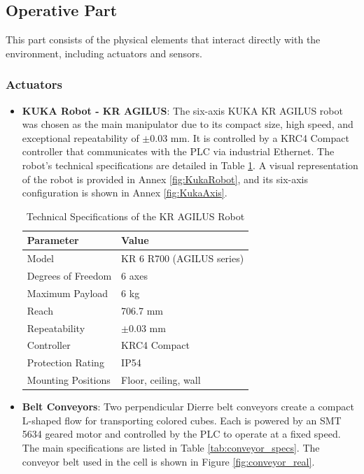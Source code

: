 \subsection{Operative Part}
This part consists of the physical elements that interact directly with the environment, including actuators and sensors.

\subsubsection{Actuators}
\begin{itemize}
  \item \textbf{KUKA Robot - KR AGILUS}: The six-axis KUKA KR AGILUS robot was chosen as the main manipulator due to its compact size, high speed, and exceptional repeatability of $\pm0.03$ mm. It is controlled by a KRC4 Compact controller that communicates with the PLC via industrial Ethernet. The robot's technical specifications are detailed in Table \ref{tab:kuka_specs}. A visual representation of the robot is provided in Annex \ref{fig:KukaRobot}, and its six-axis configuration is shown in Annex \ref{fig:KukaAxis}.
    \renewcommand{\arraystretch}{1.3} 
    \begin{table}[H] 
    \centering 
    \caption{Technical Specifications of the KR AGILUS Robot} 
    \label{tab:kuka_specs} 
    \begin{tabularx}{\textwidth}{|l|X|} 
     \hline 
     \textbf{Parameter} & \textbf{Value} \\ 
     \hline 
     Model & KR 6 R700 (AGILUS series) \\ 
     \hline 
     Degrees of Freedom & 6 axes \\ 
     \hline 
     Maximum Payload & 6 kg \\ 
     \hline 
     Reach & 706.7 mm \\ 
     \hline 
     Repeatability & $\pm0.03$ mm \\ 
     \hline 
     Controller & KRC4 Compact \\ 
     \hline 
     Protection Rating & IP54 \\ 
     \hline 
     Mounting Positions & Floor, ceiling, wall \\ 
     \hline 
    \end{tabularx} 
    \end{table}
    

    
    \item \textbf{Belt Conveyors}: Two perpendicular Dierre belt conveyors create a compact L-shaped flow for transporting colored cubes. Each is powered by an SMT 5634 geared motor and controlled by the PLC to operate at a fixed speed. The main specifications are listed in Table \ref{tab:conveyor_specs}. The conveyor belt used in the cell is shown in Figure \ref{fig:conveyor_real}.
    

\end{itemize}
